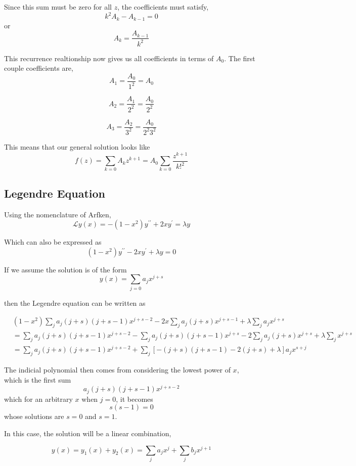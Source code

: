 Since this sum must be zero for all $z$, the coefficients must satisfy,
$$
k^2 A_k - A_{k-1} = 0
$$
or
$$
A_k = \frac{ A_{k-1} }{k^2} 
$$

This recurrence realtionship now gives us all coefficients in terms of $A_0$.
The first couple coefficients are,
$$
A_1 = \frac{ A_0 }{1^2} = A_0
$$

$$
A_2 = \frac{ A_1 }{2^2} = \frac{ A_0 }{2^2}
$$

$$
A_3 = \frac{ A_2 }{3^2} = \frac{ A_0 }{2^2 3^2}
$$

This means that our general solution looks like
$$
f(z) = \sum_{k=0} A_k z^{k+1}
= A_0 \sum_{k=0} \frac{ z^{k+1} }{k!^2}
$$




\subsection{Legendre Equation}

Using the nomenclature of Arfken,
$$
\mathcal{L} y(x) =
-(1-x^2) y^{\prime\prime} + 2x y^\prime = \lambda y
$$

Which can also be expressed as
$$
(1-x^2) y^{\prime\prime} - 2x y^\prime + \lambda y = 0
$$

If we assume the solution is of the form
$$
y(x) =
\sum_{j=0} a_j x^{j+s}
$$

then the Legendre equation can be written as

\begin{align*}
& (1-x^2) \sum_{j} a_j (j+s)(j+s-1) x^{j+s-2}
    - 2x \sum_{j} a_j (j+s) x^{j+s-1}
    + \lambda \sum_{j} a_j x^{j+s} \\
&= \sum_{j} a_j (j+s)(j+s-1) x^{j+s-2}
    - \sum_{j} a_j (j+s)(j+s-1) x^{j+s}
    -2 \sum_{j} a_j (j+s) x^{j+s}
    + \lambda \sum_{j} x^{j+s} \\
&= \sum_{j} a_j (j+s)(j+s-1) x^{j+s-2}
    + \sum_j \left[ -(j+s)(j+s-1) -2(j+s) + \lambda \right] a_j x^{s+j}
\end{align*}

The indicial polynomial then comes from considering the lowest power of $x$, which is the first sum
$$
a_j (j+s)(j+s-1) x^{j+s-2}
$$
which for an arbitrary $x$ when $j=0$, it becomes
$$
s(s-1) = 0
$$
whose solutions are $s=0$ and $s=1$.

In this case, the solution will be a linear combination,

$$
y(x) = y_1 (x) + y_2 (x)
= \sum_j a_j x^{j} + \sum_j b_j x^{j+1}
$$

